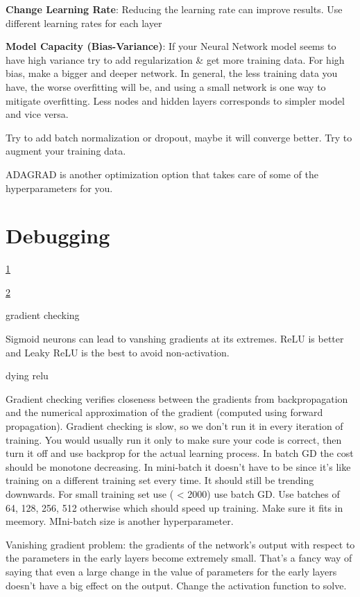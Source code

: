 \documentclass[]{book}
\begin{document}
\textbf{Change Learning Rate}: Reducing the learning rate can improve
results. Use different learning rates for each layer

\textbf{Model Capacity (Bias-Variance)}: If your Neural Network model
seems to have high variance try to add regularization \& get more
training data. For high bias, make a bigger and deeper network. In
general, the less training data you have, the worse overfitting will be,
and using a small network is one way to mitigate overfitting. Less nodes
and hidden layers corresponds to simpler model and vice versa.

Try to add batch normalization or dropout, maybe it will converge
better. Try to augment your training data.

ADAGRAD is another optimization option that takes care of some of the
hyperparameters for you.

\section{Debugging}\label{debugging}

\href{http://theorangeduck.com/page/neural-network-not-working}{1}

\href{https://towardsdatascience.com/checklist-for-debugging-neural-networks-d8b2a9434f21}{2}

gradient checking

Sigmoid neurons can lead to vanshing gradients at its extremes. ReLU is
better and Leaky ReLU is the best to avoid non-activation.

dying relu

Gradient checking verifies closeness between the gradients from
backpropagation and the numerical approximation of the gradient
(computed using forward propagation). Gradient checking is slow, so we
don't run it in every iteration of training. You would usually run it
only to make sure your code is correct, then turn it off and use
backprop for the actual learning process. In batch GD the cost should be
monotone decreasing. In mini-batch it doesn't have to be since it's like
training on a different training set every time. It should still be
trending downwards. For small training set use ( \textless{} 2000) use
batch GD. Use batches of 64, 128, 256, 512 otherwise which should speed
up training. Make sure it fits in meemory. MIni-batch size is another
hyperparameter.

Vanishing gradient problem: the gradients of the network's output with
respect to the parameters in the early layers become extremely small.
That's a fancy way of saying that even a large change in the value of
parameters for the early layers doesn't have a big effect on the output.
Change the activation function to solve.
\end{document}
